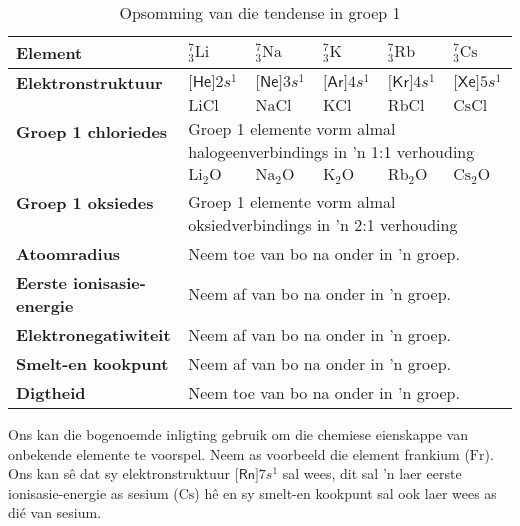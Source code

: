 \begin{table}[H]
 \begin{center}
  \begin{tabular}{|l|p{1cm}|p{1cm}|p{1cm}|p{1cm}|p{1cm}|} \hline
\textbf{Element} & $^{7}_{3}\text{Li}$ & $^{7}_{3}\text{Na}$ &  $^{7}_{3}\text{K}$ & $^{7}_{3}\text{Rb}$ &  $^{7}_{3}\text{Cs}$ \\ \hline
\textbf{Elektronstruktuur} & $\textsf{[He]}2s^{1}$ & $\textsf{[Ne]}3s^{1}$ & $\textsf{[Ar]}4s^{1}$ & $\textsf{[Kr]}4s^{1}$ & $\textsf{[Xe]}5s^{1}$ \\ \hline
   \multirow{2}{*}{\textbf{Groep 1 chloriedes}} & $\text{LiCl}$ & $\text{NaCl}$ & $\text{KCl}$ & $\text{RbCl}$ & $\text{CsCl}$ \\ \cline{2-6}
   & \multicolumn{5}{|p{6cm}|}{Groep 1 elemente vorm almal halogeenverbindings in  'n 1:1 verhouding} \\ \hline
\multirow{2}{*}{\textbf{Groep 1 oksiedes}} & $\text{Li}_{2}\text{O}$ & $\text{Na}_{2}\text{O}$ & $\text{K}_{2}\text{O}$ & $\text{Rb}_{2}\text{O}$ & $\text{Cs}_{2}\text{O}$\\ \cline{2-6}
   & \multicolumn{5}{|l|}{Groep 1 elemente vorm almal oksiedverbindings in  'n 2:1 verhouding} \\ \hline
\textbf{Atoomradius} & \multicolumn{5}{p{6cm}|}{Neem toe van bo na onder in  'n groep.} \\ \hline
\textbf{Eerste ionisasie-energie} & \multicolumn{5}{p{6cm}|}{Neem af van bo na onder in  'n groep.} \\ \hline
\textbf{Elektronegatiwiteit} & \multicolumn{5}{p{6cm}|}{Neem af van bo na onder in  'n groep.} \\ \hline
\textbf{Smelt-en kookpunt} & \multicolumn{5}{p{6cm}|}{Neem af van bo na onder in  'n groep.} \\ \hline
\textbf{Digtheid} & \multicolumn{5}{p{6cm}|}{Neem toe van bo na onder in  'n groep.} \\ \hline
  \end{tabular}
\caption{Opsomming van die tendense in groep 1}
\label{tab:group1trends}
 \end{center}

\end{table}
\par 
Ons kan die bogenoemde inligting gebruik om die chemiese eienskappe van onbekende elemente te voorspel. Neem as voorbeeld die element frankium ($\text{Fr}$). Ons kan sê dat sy elektronstruktuur $\textsf{[Rn]}7s^{1}$ sal wees, dit sal 'n laer eerste ionisasie-energie as sesium ($\text{Cs}$) h\^{e} en sy smelt-en kookpunt sal ook laer wees as dié van sesium.\\
